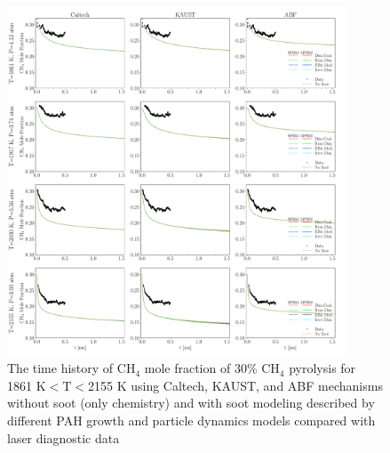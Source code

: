 \begin{figure}[H]
	\centering
	\includegraphics[width=0.9\textwidth]{Figures/Results/Shocktube/Stanford/june/30CH4_CH4_mechs_s0.pdf}
	\caption{The time history of $\mathrm{CH_4}$ mole fraction of 30\% $\mathrm{CH_4}$ pyrolysis for 1861 K$<\mathrm{T}<$2155 K using Caltech, KAUST, and ABF mechanisms without soot (only chemistry) and with soot modeling described by different PAH growth and particle dynamics models compared with laser diagnostic data}
	\label{fig:shocktubest_30ch4_ch4_0} 
\end{figure}


